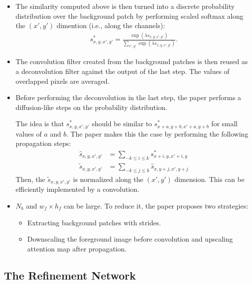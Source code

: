 \documentclass[10pt]{article}
\begin{document}
\begin{itemize}
    \item The similarity computed above is then turned into a discrete probability distribution over the background patch by performing scaled softmax along the $(x',y')$ dimention (i.e., along the channels):
    \begin{align*}
      s^*_{x,y,x',y'} = 
      \frac{
        \exp(\lambda s_{x,y,x',y'})
      } { 
        \sum_{x',y'} \exp(\lambda s_{x,y,x',y'})
      }.
    \end{align*}

    \item The convolution filter created from the background patches is then reused as a deconvolution filter against the output of the last step. The values of overlapped pixels are averaged.

    \item Before performing the deconvolution in the last step, the paper performs a diffusion-like steps on the probability distribution.

    The idea is that $s^*_{x,y,x',y'}$ should be similar to $s^*_{x+a,y+b,x'+a,y+b}$ for small values of $a$ and $b$. The paper makes this the case by performing the following propagation steps:
    \begin{align*}
      \hat{s}_{x,y,x',y'} 
      &= \sum_{-k \leq i \leq k} s^*_{x+i,y,x'+i,y} \\
      \tilde{s}_{x,y,x',y'}
      &= \sum_{-k \leq j \leq k} \hat{s}_{x,y+j,x',y+j} 
    \end{align*}
    Then, the $\tilde{s}_{x,y,x',y'}$ is normalized along the $(x',y')$ dimension. This can be efficiently implemented by a convolution.

    \item $N_b$ and $w_f \times h_f$ can be large. To reduce it, the paper proposes two strategies:
    \begin{itemize}
      \item Extracting background patches with strides.
      \item Downscaling the foreground image before convolution and upscaling attention map after propagation.
    \end{itemize}
  \end{itemize}

  \subsection{The Refinement Network}
\end{document}
